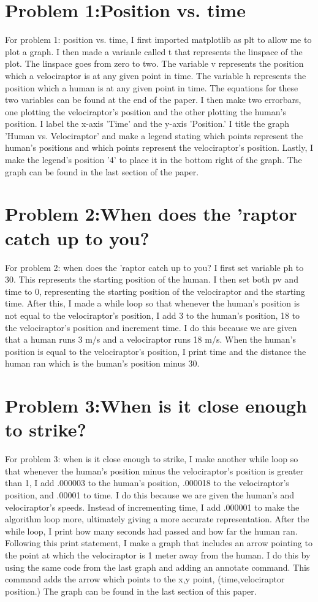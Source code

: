 \documentclass[twocolumn]{revtex4}
\begin{document}
\section{Problem 1:Position vs. time}
	For problem 1: position vs. time, I first imported matplotlib as plt to allow me to plot a graph.  I then made a varianle called t that represents the linspace of the plot.  The linspace goes from zero to two.  The variable v represents the position which a velociraptor is at any given point in time.  The variable h represents the position which a human is at any given point in time.  The equations for these two variables can be found at the end of the paper.  I then make two errorbars, one plotting the velociraptor's position and the other plotting the human's position.  I label the x-axis 'Time' and the y-axis 'Position.'  I title the graph 'Human vs. Velociraptor' and make a legend stating which points represent the human's positions and which points represent the velociraptor's position.  Lastly, I make the legend's position '4' to place it in the bottom right of the graph. The graph can be found in the last section of the paper.

\section{Problem 2:When does the 'raptor catch up to you?}	
	For problem 2: when does the 'raptor catch up to you? I first set variable ph to 30.  This represents the starting position of the human.  I then set both pv and time to 0, representing the starting position of the velociraptor and the starting time.  After this, I made a while loop so that whenever the human's position is not equal to the velociraptor's position, I add 3 to the human's position, 18 to the velociraptor's position and increment time.  I do this because we are given that a human runs 3 m/s and a velociraptor runs 18 m/s.  When the human's position is equal to the velociraptor's position, I print time and the distance the human ran which is the human's position minus 30.
\section{Problem 3:When is it close enough to strike?}
For problem 3: when is it close enough to strike, I make another while loop so that whenever the human's position minus the velociraptor's position is greater than 1, I add .000003 to the human's position, .000018 to the velociraptor's position, and .00001 to time.  I do this because we are given the human's and velociraptor's speeds.  Instead of incrementing time, I add .000001 to make the algorithm loop more, ultimately giving a more accurate representation.  After the while loop, I print how many seconds had passed and how far the human ran.  Following this print statement, I make a graph that includes an arrow pointing to the point at which the velociraptor is 1 meter away from the human.  I do this by using the same code from the last graph and adding an annotate command.  This command adds the arrow which points to the x,y point, (time,velociraptor position.)	  The graph can be found in the last section of this paper.
\end{document}
